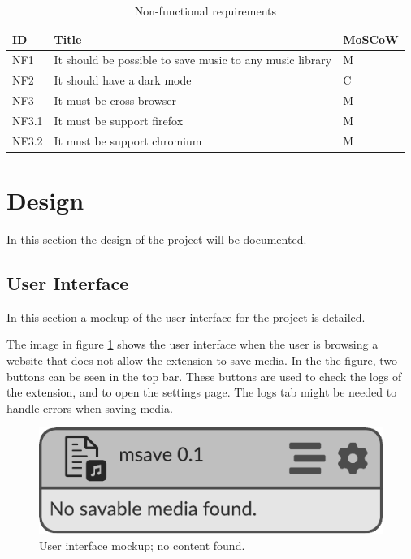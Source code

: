 \begin{table}[H]
\caption{Non-functional requirements}
\centering
\begin{tabular}{|l|l|l|}
\hline
\textbf{ID}  & \textbf{Title}                                              & \textbf{MoSCoW}  \\ \hline
NF1          & It should be possible to save music to any music library    & M                \\ \hline
NF2          & It should have a dark mode                                  & C                \\ \hline
NF3          & It must be cross-browser                                    & M                \\ \hline
NF3.1        & It must be support firefox                                  & M                \\ \hline
NF3.2        & It must be support chromium                                 & M                \\ \hline
\end{tabular}
\label{tab:nfrequirements}
\end{table}



\section{Design}
In this section the design of the project will be documented.

\subsection{User Interface}
In this section a mockup of the user interface for the project is detailed.

The image in figure \ref{fig:ui-mockup-1} shows the user interface 
when the user is browsing a website that does not allow the extension to save media.
In the the figure, two buttons can be seen in the top bar.
These buttons are used to check the logs of the extension, and to open the settings page.
The logs tab might be needed to handle errors when saving media.
\begin{figure}[H]
    \centering
    \includegraphics[page=1]{resources/mockup-v0.1.pdf}
    \caption{User interface mockup; no content found.}
\label{fig:ui-mockup-1}
\end{figure}


